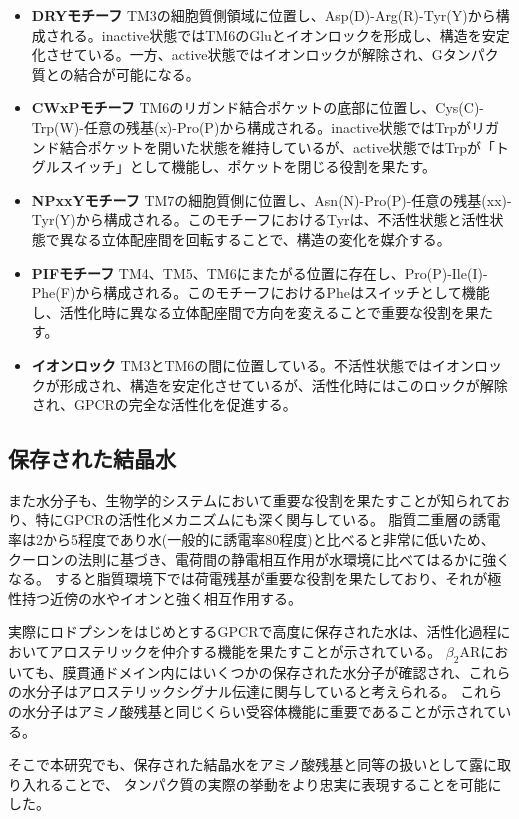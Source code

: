 \begin{itemize}
  \item \textbf{DRYモチーフ}  
  TM3の細胞質側領域に位置し、Asp(D)-Arg(R)-Tyr(Y)から構成される。inactive状態ではTM6のGluとイオンロックを形成し、構造を安定化させている。一方、active状態ではイオンロックが解除され、Gタンパク質との結合が可能になる。

  \item \textbf{CWxPモチーフ}  
  TM6のリガンド結合ポケットの底部に位置し、Cys(C)-Trp(W)-任意の残基(x)-Pro(P)から構成される。inactive状態ではTrpがリガンド結合ポケットを開いた状態を維持しているが、active状態ではTrpが「トグルスイッチ」として機能し、ポケットを閉じる役割を果たす。

  \item \textbf{NPxxYモチーフ}  
  TM7の細胞質側に位置し、Asn(N)-Pro(P)-任意の残基(xx)-Tyr(Y)から構成される。このモチーフにおけるTyrは、不活性状態と活性状態で異なる立体配座間を回転することで、構造の変化を媒介する。

  \item \textbf{PIFモチーフ}  
  TM4、TM5、TM6にまたがる位置に存在し、Pro(P)-Ile(I)-Phe(F)から構成される。このモチーフにおけるPheはスイッチとして機能し、活性化時に異なる立体配座間で方向を変えることで重要な役割を果たす。

  \item \textbf{イオンロック}  
  TM3とTM6の間に位置している。不活性状態ではイオンロックが形成され、構造を安定化させているが、活性化時にはこのロックが解除され、GPCRの完全な活性化を促進する。
\end{itemize}

\subsection{保存された結晶水}
また水分子も、生物学的システムにおいて重要な役割を果たすことが知られており、特にGPCRの活性化メカニズムにも深く関与している。
脂質二重層の誘電率は2から5程度であり水(一般的に誘電率80程度)と比べると非常に低いため、
クーロンの法則に基づき、電荷間の静電相互作用が水環境に比べてはるかに強くなる。
すると脂質環境下では荷電残基が重要な役割を果たしており、それが極性持つ近傍の水やイオンと強く相互作用する。

実際にロドプシンをはじめとするGPCRで高度に保存された水は、活性化過程においてアロステリックを仲介する機能を果たすことが示されている\cite{angel2009conserved}。
$\beta_2$ARにおいても、膜貫通ドメイン内にはいくつかの保存された水分子が確認され、これらの水分子はアロステリックシグナル伝達に関与していると考えられる。
これらの水分子はアミノ酸残基と同じくらい受容体機能に重要であることが示されている。

そこで本研究でも、保存された結晶水をアミノ酸残基と同等の扱いとして露に取り入れることで、
タンパク質の実際の挙動をより忠実に表現することを可能にした。
